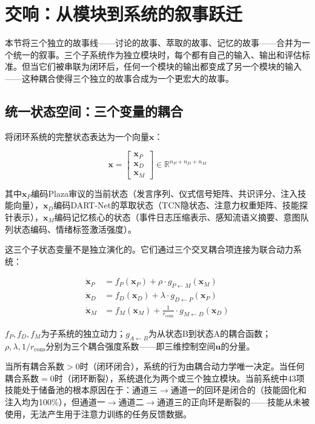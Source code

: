\documentclass[twocolumn,10.5pt]{ctexart}
\begin{document}
\section{交响：从模块到系统的叙事跃迁}

本节将三个独立的故事线——讨论的故事、萃取的故事、记忆的故事——合并为一个统一的叙事。三个子系统作为独立模块时，每个都有自己的输入、输出和评估标准。但当它们被串联为闭环后，任何一个模块的输出都变成了另一个模块的输入——这种耦合使得三个独立的故事合成为一个更宏大的故事。

\subsection{统一状态空间：三个变量的耦合}

将闭环系统的完整状态表达为一个向量$\mathbf{x}$：

\begin{equation}
\mathbf{x} = \begin{bmatrix}
\mathbf{x}_P \\ \mathbf{x}_D \\ \mathbf{x}_M
\end{bmatrix} \in \mathbb{R}^{n_P + n_D + n_M}
\label{eq:unified_state}
\end{equation}

其中$\mathbf{x}_P$编码Plaza审议的当前状态（发言序列、仪式信号矩阵、共识评分、注入技能向量），$\mathbf{x}_D$编码DART-Net的萃取状态（TCN隐状态、注意力权重矩阵、技能探针表示），$\mathbf{x}_M$编码记忆核心的状态（事件日志压缩表示、感知流语义摘要、意图队列状态编码、情绪标签激活强度）。

这三个子状态变量不是独立演化的。它们通过三个交叉耦合项连接为联合动力系统：

\begin{align}
\dot{\mathbf{x}}_P &= f_P(\mathbf{x}_P) + \rho \cdot g_{P \leftarrow M}(\mathbf{x}_M) \label{eq:dot_P} \\
\dot{\mathbf{x}}_D &= f_D(\mathbf{x}_D) + \lambda \cdot g_{D \leftarrow P}(\mathbf{x}_P) \label{eq:dot_D} \\
\dot{\mathbf{x}}_M &= f_M(\mathbf{x}_M) + \frac{1}{r_{\text{cons}}} \cdot g_{M \leftarrow D}(\mathbf{x}_D) \label{eq:dot_M}
\end{align}

$f_P, f_D, f_M$为子系统的独立动力；$g_{A \leftarrow B}$为从状态B到状态A的耦合函数；$\rho, \lambda, 1/r_{\text{cons}}$分别为三个耦合强度系数——即三维控制空间$\mathbf{u}$的分量。

当所有耦合系数$>0$时（闭环闭合），系统的行为由耦合动力学唯一决定。当任何耦合系数$=0$时（闭环断裂），系统退化为两个或三个独立模块。当前系统中43项技能处于储备池的根本原因在于：通道三$\to$通道一的回环是闭合的（技能固化和注入均为100\%），但通道一$\to$通道二$\to$通道三的正向环是断裂的——技能从未被使用，无法产生用于注意力训练的任务反馈数据。
\end{document}
